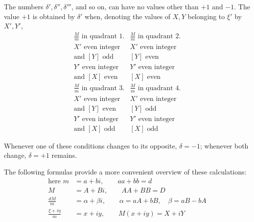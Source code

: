 The numbers $\delta',\delta'',\delta'''$, and so on, can have no values other than $+1$ and $-1$. The value $+1$ is obtained by $\delta'$ when, denoting the values of $X,Y$ belonging to $\xi'$ by $X',Y'$,
\[
\begin{array}{l|l}
\frac{M}{m}\text{ in quadrant 1.}&\frac{M}{m}\text{ in quadrant 2.}\\
X'\text{ even integer}&X'\text{ even integer}\\
\text{and }[Y]\text{ odd}&[Y]\text{ even}\\\hline
Y'\text{ even integer}&Y'\text{ even integer}\\
\text{and }[X]\text{ even}&[X]\text{ even}
\end{array}
\]
\[
\begin{array}{l|l}
\frac{M}{m}\text{ in quadrant 3.}&\frac{M}{m}\text{ in quadrant 4.}\\
X'\text{ even integer}&X'\text{ even integer}\\
\text{and }[Y]\text{ even}&[Y]\text{ odd}\\\hline
Y'\text{ even integer}&Y'\text{ even integer}\\
\text{and }[X]\text{ odd}&[X]\text{ odd}
\end{array}
\]

Whenever one of these conditions changes to its opposite, $\delta=-1$; whenever both change, $\delta=+1$ remains.

The following formulas provide a more convenient overview of these calculations:
\[
\begin{aligned}
\text{here }m&=a+bi,\qquad aa+bb=d\\
M&=A+Bi,\qquad AA+BB=D\\
\frac{dM}{m}&=\alpha+\beta i,\qquad\alpha=aA+bB,\quad\beta=aB-bA\\
\frac{\xi+i\eta}{m}&=x+iy,\qquad M(x+iy)=X+iY
\end{aligned}
\]

